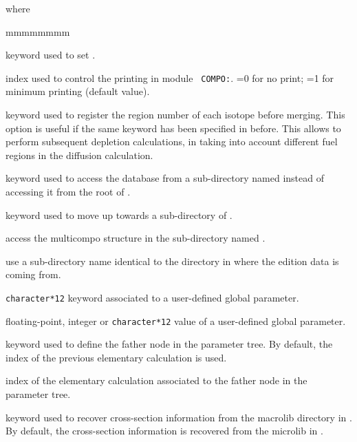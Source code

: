\noindent where
\begin{ListeDeDescription}{mmmmmmmm}

\item[\moc{EDIT}] keyword used to set .

\item[\dusa{iprint}] index used to control the printing in module {\tt
COMPO:}. =0 for no print; =1 for minimum printing (default value).

\item[\moc{ALLX}] keyword used to register the region number of each isotope before merging. This option is useful if the same
keyword has been specified in  before. This allows to perform subsequent depletion calculations, in taking into account
different fuel regions in the diffusion calculation.

\item[\moc{STEP}] keyword used to access the database from a sub-directory named  instead of
accessing it from the root of .

\item[\moc{UP}] keyword used to move up towards a sub-directory of .

\item[\dusa{NAMDIR}] access the {\sc multicompo} structure in the sub-directory named .

\item[\moc{*}] use a sub-directory name identical to the directory in 
where the edition data is coming from.

\item[\dusa{PARKEY}] {\tt character*12} keyword associated to a user-defined
global parameter.

\item[\dusa{value}] floating-point, integer or {\tt character*12} value of a user-defined
global parameter.

\item[\moc{ORIG}] keyword used to define the father node in the parameter tree. By
default, the index of the previous elementary calculation is used.

\item[\dusa{orig}] index of the elementary calculation associated to the father node in the
parameter tree.

\item[\moc{MACRO}] keyword used to recover cross-section information from the
macrolib directory in . By default, the cross-section information
is recovered from the microlib in .


\end{ListeDeDescription}
